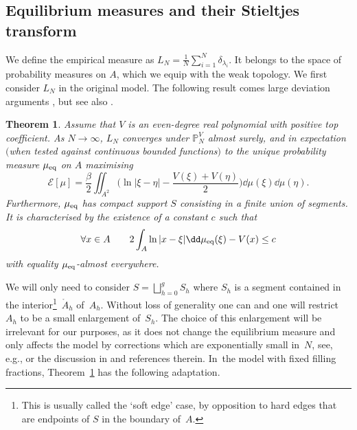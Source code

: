 \documentclass[10pt,a4paper]{amsart}
\numberwithin{equation}{section}
\newtheorem{Theorem}{Theorem}[section]
\begin{document}
\subsection{Equilibrium measures and their Stieltjes transform}
\label{eqmessec}
We define the empirical measure as $L_N = \frac{1}{N}\sum_{i=1}^{N}\delta_{\lambda_{i}}$. It belongs to the space of probability measures on $A$, which we equip with the weak topology. We first consider $L_N$ in the original model. The following result comes large deviation arguments \cite[Theorem~2.6.1 and Corollary~2.6.3]{BookAG}, but see also \cite{APS01,Deift,Johan}.
\begin{Theorem}\label{thm:equilibrium}
 Assume that $V$ is an even-degree real polynomial with positive top coefficient. As $N \rightarrow \infty$, $L_{N}$
 converges under $\mathbb{P}_{N}^{V}$ almost surely, and in
 expectation $($when tested against continuous bounded functions$)$ to the unique probability measure
 $\mu_{{\rm eq}}$ on $A$ maximising
 \begin{equation}\label{energy}
 \mathcal{E}[\mu] = \frac{\beta}{2}\iint_{A^2} \biggl( \ln|\xi - \eta| -\frac{V(\xi) + V(\eta)}{2}\biggr)\dd\mu(\xi)\dd\mu(\eta).
 \end{equation}
 Furthermore, $\mu_{{\rm eq}}$ has compact
 support $S$ consisting in a finite union of segments. It is characterised by the existence of a constant $c$ such
 that
 \begin{equation}\label{eq:charc-eq}
	\forall x \in A \qquad 2\int_{A}\ln|x - \xi|\dd\mu_{{\rm eq}}(\xi) - V(x) \leq c
 \end{equation}
 with equality $\mu_{{\rm eq}}$-almost everywhere.
\end{Theorem}

We will only need to consider $S = \bigsqcup_{h = 0}^{g} S_h$ where $S_h$ is a segment contained in the interior\footnote{This is usually called the `soft edge' case, by opposition to hard edges that are endpoints of $S$ in the boundary of~$A$.}~$\mathring{A}_h$ of~$A_h$.
 Without loss of generality one can and one will restrict $A_h$ to be a small enlargement of~$S_h$. The choice of this enlargement will be irrelevant for our purposes, as it does not change the equilibrium measure and only affects the model by corrections which are exponentially small in~$N$, see, e.g., \cite[Proposition~2]{APS01} or the discussion in \cite[Section~2]{BG11} and references therein. In~the model with fixed filling fractions, Theorem~\ref{thm:equilibrium} has the following adaptation.
\end{document}
